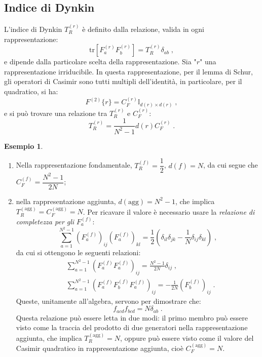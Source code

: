 \documentclass[12pt,a4paper]{article}
\theoremstyle{definition}
\newtheorem{exm}{Esempio}
\newcommand{\tr}{\mathrm{tr}}
\numberwithin{equation}{section}
\begin{document}
\subsection{Indice di Dynkin}
L'indice di Dynkin $T_R^{(r)}$ è definito dalla relazione, valida in ogni rappresentazione:
\begin{equation}
\tr[F_a^{(r)}F_b^{(r)}]=T_R^{(r)}\delta_{ab}\;,
\end{equation}
e dipende dalla particolare scelta della rappresentazione. Sia "$r$" una rappresentazione irriducibile. In questa rappresentazione, per il lemma di Schur, gli operatori di Casimir sono tutti multipli dell'identità, in particolare, per il quadratico, si ha:
\begin{equation}
F^{(2)}\{r\}=C_F^{(r)}\mathbb{I}_{d(r)\times d(r)}\;,
\end{equation}
e si può trovare una relazione tra $T_R^{(r)}$ e $C_F^{(r)}$:
\begin{equation}
T_R^{(r)}=\frac{1}{N^2-1}d(r)C_F^{(r)}\;.
\end{equation}
\begin{exm} 
\begin{enumerate} 
\item Nella rappresentazione fondamentale, $T_R^{(f)}=\dfrac{1}{2}$, $d(f)=N$, da cui segue che $C_F^{(f)}=\dfrac{N^2-1}{2N}$;
\item nella rappresentazione aggiunta, $d(\mathrm{agg})=N^2-1$, che implica $T_R^{(\mathrm{agg})}=C_F^{(\mathrm{agg})}=N$. Per ricavare il valore è necessario usare la \emph{relazione di completezza per gli} $F_a^{(f)}$:
\begin{equation}
\sum_{a=1}^{N^2-1}\left(F_a^{(f)}\right)_{ij}\left(F_a^{(f)}\right)_{kl}=\frac{1}{2}\left(\delta_{il}\delta_{jk}-\frac{1}{N}\delta_{ij}\delta_{kl}\right)\;,
\end{equation}
da cui si ottengono le seguenti relazioni:
\begin{align}
&\sum_{a=1}^{N^2-1}\left(F_a^{(f)}F_a^{(f)}\right)_{ij}=\frac{N^2-1}{2N}\delta_{ij}\;, \\
&\sum_{a=1}^{N^2-1}\left(F_a^{(f)}F_b^{(f)}F_a^{(f)}\right)_{ij}=-\frac{1}{2N}\left(F_b^{(f)}\right)_{ij}\;.
\end{align}
Queste, unitamente all'algebra, servono per dimostrare che:
\begin{equation}
f_{acd}f_{bcd}=N\delta_{ab}\;.
\end{equation}
Questa relazione può essere letta in due modi: il primo membro può essere visto come la traccia del prodotto di due generatori nella rappresentazione aggiunta, che implica $T_R^{(\mathrm{agg})}=N$, oppure può essere visto come il valore del Casimir quadratico in rappresentazione aggiunta, cioè $C_F^{(\mathrm{agg})}=N$.
\end{enumerate}
\end{exm}
\cleardoublepage
\end{document}
